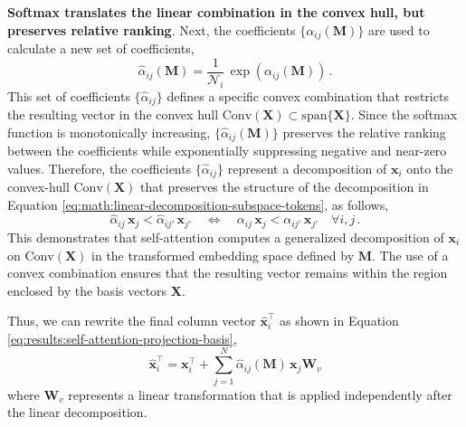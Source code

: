 \textbf{Softmax translates the linear combination in the convex hull, but preserves relative ranking}. Next, the coefficients $\{\alpha_{ij}(\bm{M})\}$ are used to calculate a new set of coefficients,
%
\begin{equation}
    \hat{\alpha}_{ij}(\bm{M}) = \frac{1}{\mathcal{N}_i}\, \exp(\alpha_{ij}(\bm{M}))\,.
\end{equation}
%
This set of coefficients $\{\hat{\alpha}_{ij}\}$ defines a specific convex combination that restricts the resulting vector in the convex hull $\text{Conv}(\bm{X}) \subset \text{span}\{\bm{X}\}$.
%
Since the softmax function is monotonically increasing, $\{\hat{\alpha}_{ij}(\bm{M})\}$ preserves the relative ranking between the coefficients while exponentially suppressing negative and near-zero values.
%
Therefore, the coefficients $\{\hat{\alpha}_{ij}\}$ represent a decomposition of $\bm{x}_i$ onto the convex-hull $\text{Conv}(\bm{X})$ that preserves the structure of the decomposition in Equation \ref{eq:math:linear-decomposition-subspace-tokens}, as follows,
%
\begin{equation}
     \hat{\alpha}_{ij}\,\bm{x}_j < \hat{\alpha}_{ij'}\,\bm{x}_{j'} \quad \Leftrightarrow \quad \alpha_{ij}\,\bm{x}_j < \alpha_{ij'}\,\bm{x}_{j'} \quad \forall i,j \,.
\end{equation}
%
This demonstrates that self-attention computes a generalized decomposition of $\bm{x}_i$ on $\text{Conv}(\bm{X})$ in the transformed embedding space defined by $\bm{M}$.
%
The use of a convex combination ensures that the resulting vector remains within the region enclosed by the basis vectors $\bm{X}$.
%

Thus, we can rewrite the final column vector $\hat{\bm{x}}^\top_i$ as shown in Equation \ref{eq:results:self-attention-projection-basis},
%
\begin{equation}
    \hat{\bm{x}}^\top_i = \bm{x}^\top_i + \sum_{j=1}^N  \hat{\alpha}_{ij}(\bm{M})\,\bm{x}_j\bm{W}_v 
\end{equation}
%
where $\bm{W}_v$ represents a linear transformation that is applied independently after the linear decomposition. 
%
